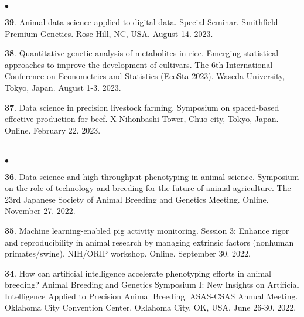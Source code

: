 \documentclass[margin,line,10pt]{res}
\newenvironment{list2}{
  \begin{list}{$\bullet$}{%
      \setlength{\itemsep}{0in}
      \setlength{\parsep}{0in} \setlength{\parskip}{0in}
      \setlength{\topsep}{0in} \setlength{\partopsep}{0in} 
      \setlength{\leftmargin}{0.2in}}}{\end{list}}
\begin{document}
\begin{resume}
\begin{list2}
  \vspace{0.5cm}

  \item [{\bf 39}.] Animal data science applied to digital data. Special Seminar. Smithfield Premium Genetics. Rose Hill, NC, USA. August 14. 2023. 

  \vspace{0.5cm}

  \item [{\bf 38}.] Quantitative genetic analysis of metabolites in rice. Emerging statistical approaches to improve the development of cultivars. The 6th International Conference on Econometrics and Statistics (EcoSta 2023). Waseda University, Tokyo, Japan. August 1-3. 2023.

  \vspace{0.5cm}

  \item [{\bf 37}.] Data science in precision livestock farming. Symposium on spaced-based effective production for beef. X-Nihonbashi Tower, Chuo-city, Tokyo, Japan. Online. February 22. 2023.

\end{list2}



\section{}
\begin{list2}
  

\item [{\bf 36}.] Data science and high-throughput phenotyping in animal science. Symposium on the role of technology and breeding for the future of animal agriculture. The 23rd Japanese Society of Animal Breeding and Genetics Meeting. Online. November 27. 2022. 

\vspace{0.5cm}

\item [{\bf 35}.] Machine learning-enabled pig activity monitoring. Session 3: Enhance rigor and reproducibility in animal research by managing extrinsic factors (nonhuman primates/swine). NIH/ORIP workshop. Online. September 30. 2022.

\vspace{0.5cm}

\item [{\bf 34}.] How can artificial intelligence accelerate phenotyping efforts in animal breeding? Animal Breeding and Genetics Symposium I: New Insights on Artificial Intelligence Applied to Precision Animal Breeding. ASAS-CSAS Annual Meeting. Oklahoma City Convention Center, Oklahoma City, OK, USA. June 26-30. 2022.


\end{list2}
\end{resume}
\end{document}
